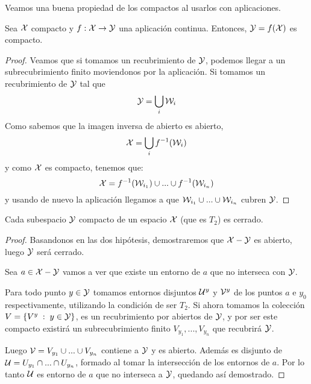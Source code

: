 Veamos una buena propiedad de los compactos al usarlos con aplicaciones.


\begin{prop}
	\label{comp_comp_comp}
	Sea $\mathcal{X}$ compacto y $f:\mathcal{X} \rightarrow \mathcal{Y}$ una aplicación continua. Entonces, $\mathcal{Y} = f(\mathcal{X})$ es compacto.
	\begin{proof}
		Veamos que si tomamos un recubrimiento de $\mathcal{Y}$, podemos llegar a un subrecubrimiento finito moviendonos por la aplicación. Si tomamos un recubrimiento de $\mathcal{Y}$ tal que
		\begin{equation*}
			\mathcal{Y} = \bigcup_{i}\mathcal{W}_i
		\end{equation*}
		Como sabemos que la imagen inversa de abierto es abierto,
		\begin{equation*}
			\mathcal{X} = \bigcup_{i}f^{-1}(\mathcal{W}_i)
		\end{equation*}
		y como $\mathcal{X}$ es compacto, tenemos que:
		\begin{equation*}
			\mathcal{X}  = f^{-1}(\mathcal{W}_{i_1}) \cup ... \cup f^{-1}(\mathcal{W}_{i_n})
		\end{equation*}
		y usando de nuevo la aplicación llegamos a que $\mathcal{W}_{i_1} \cup ... \cup \mathcal{W}_{i_n}$ cubren $\mathcal{Y}$.
	\end{proof}
\end{prop}


\begin{prop}
	Cada subespacio $\mathcal{Y}$ compacto de un espacio $\mathcal{X}$ (que es $T_2$) es cerrado.
	\begin{proof}
		Basandonos en las dos hipótesis, demostraremos que $\mathcal{X} - \mathcal{Y}$ es abierto, luego $\mathcal{Y}$ será cerrado.
		
		Sea $a \in \mathcal{X}-\mathcal{Y}$ vamos a ver que existe un entorno de $a$ que no interseca con $\mathcal{Y}$.
		
		Para todo punto $y \in \mathcal{Y}$ tomamos entornos disjuntos $\mathcal{U}^y$ y $\mathcal{V}^y$ de los puntos $a$ e $y_0$ respectivamente, utilizando la condición de ser $T_2$. Si ahora tomamos la colección $V = \{V^y \;:\; y \in \mathcal{Y}\}$, es un recubrimiento por abiertos de $\mathcal{Y}$, y por ser este compacto existirá un subrecubrimiento finito $V_{y_1}, ..., V_{y_n}$ que recubrirá $\mathcal{Y}$.
		
		Luego $\mathcal{V} = V_{y_1} \cup ... \cup V_{y_n}$ contiene a $\mathcal{Y}$ y es abierto. Además es disjunto de $\mathcal{U} = U_{y_1} \cap ... \cap U_{y_n}$, formado al tomar la intersección de los entornos de $a$. Por lo tanto $\mathcal{U}$ es entorno de $a$ que no interseca a $\mathcal{Y}$, quedando así demostrado.
	\end{proof}
\end{prop}


